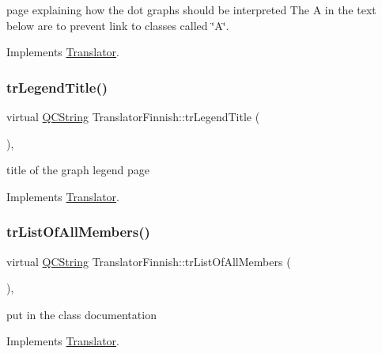 page explaining how the dot graph\textquotesingle{}s should be interpreted The A in the text below are to prevent link to classes called \char`\"{}\+A\char`\"{}. 

Implements \mbox{\hyperlink{class_translator}{Translator}}.

\mbox{\label{class_translator_finnish_a16645369f49ebf5361c7346614bf85e8}} 
\subsubsection{\texorpdfstring{trLegendTitle()}{trLegendTitle()}}
{\footnotesize\ttfamily virtual \mbox{\hyperlink{class_q_c_string}{Q\+C\+String}} Translator\+Finnish\+::tr\+Legend\+Title (\begin{DoxyParamCaption}{ }\end{DoxyParamCaption})\hspace{0.3cm}{\ttfamily [inline]}, {\ttfamily [virtual]}}

title of the graph legend page 

Implements \mbox{\hyperlink{class_translator}{Translator}}.

\mbox{\label{class_translator_finnish_a38b247bbb722225414aba73f4db0f267}} 
\subsubsection{\texorpdfstring{trListOfAllMembers()}{trListOfAllMembers()}}
{\footnotesize\ttfamily virtual \mbox{\hyperlink{class_q_c_string}{Q\+C\+String}} Translator\+Finnish\+::tr\+List\+Of\+All\+Members (\begin{DoxyParamCaption}{ }\end{DoxyParamCaption})\hspace{0.3cm}{\ttfamily [inline]}, {\ttfamily [virtual]}}

put in the class documentation 

Implements \mbox{\hyperlink{class_translator}{Translator}}.

\mbox{\label{class_translator_finnish_aaaa1e15a531a68d20191a9fddbb786dd}} 
